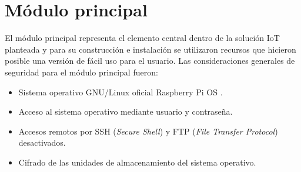 












\section{Módulo principal}

El módulo principal representa el elemento central dentro de la solución IoT planteada y para  su construcción e instalación se utilizaron recursos que hicieron posible una versión de fácil uso para el usuario. Las consideraciones generales de seguridad para el módulo principal fueron:

\begin{itemize}
\item Sistema operativo GNU/Linux oficial Raspberry Pi OS \citep{WEBSITE:44}\citep{WEBSITE:45}.
\item Acceso al sistema operativo mediante usuario y contraseña.
\item Accesos remotos por SSH (\emph{Secure Shell}) y FTP (\emph{File Transfer Protocol})  desactivados.
\item Cifrado de las unidades de almacenamiento del sistema operativo.
\end{itemize}

